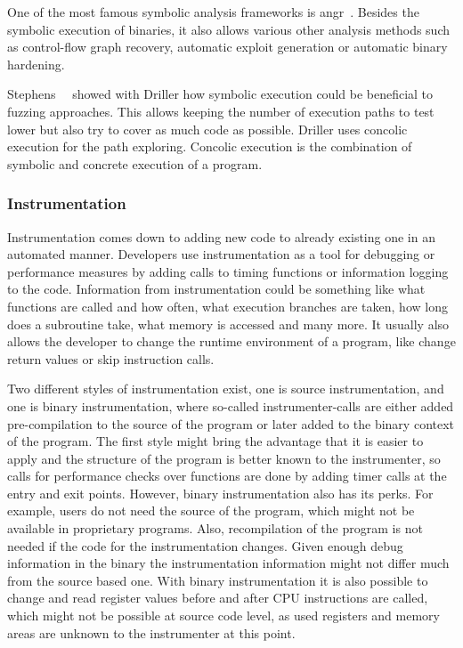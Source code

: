 One of the most famous symbolic analysis frameworks is angr~\cite{angrpaper}.
Besides the symbolic execution of binaries, it also allows various other
analysis methods such as control-flow graph recovery, automatic exploit
generation or automatic binary hardening.

Stephens~\etal~\cite{driller} showed with Driller how symbolic execution could
be beneficial to fuzzing approaches. This allows keeping the number of execution
paths to test lower but also try to cover as much code as possible. Driller uses
concolic execution for the path exploring. Concolic execution is the combination
of symbolic and concrete execution of a program.

\subsubsection{Instrumentation}

Instrumentation comes down to adding new code to already existing one in an
automated manner. Developers use instrumentation as a tool for debugging or
performance measures by adding calls to timing functions or information logging
to the code. Information from instrumentation could be something like what
functions are called and how often, what execution branches are taken, how long
does a subroutine take, what memory is accessed and many more. It usually also
allows the developer to change the runtime environment of a program, like change
return values or skip instruction calls.

Two different styles of instrumentation exist, one is source instrumentation,
and one is binary instrumentation, where so-called instrumenter-calls are either
added pre-compilation to the source of the program or later added to the binary
context of the program. The first style might bring the advantage that it is
easier to apply and the structure of the program is better known to the
instrumenter, so calls for performance checks over functions are done by adding
timer calls at the entry and exit points. However, binary instrumentation also
has its perks. For example, users do not need the source of the program, which
might not be available in proprietary programs. Also, recompilation of the
program is not needed if the code for the instrumentation changes. Given enough
debug information in the binary the instrumentation information might not differ
much from the source based one. With binary instrumentation it is also possible
to change and read register values before and after CPU instructions are called,
which might not be possible at source code level, as used registers and memory
areas are unknown to the instrumenter at this point.

